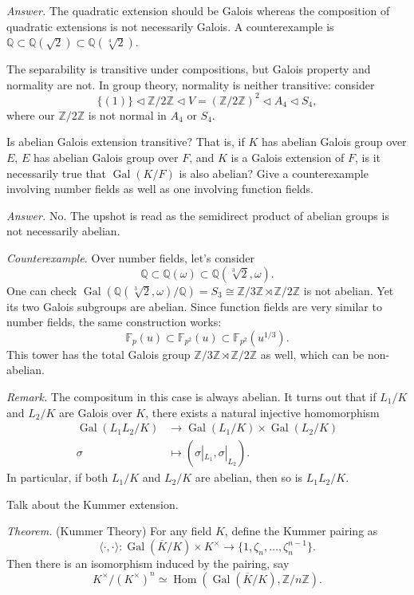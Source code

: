 \documentclass{mathproblems}
\newcommand\Q{\mathbb{Q}}
\newcommand\Z{\mathbb{Z}}
\newcommand\F{\mathbb{F}}
\DeclareMathOperator{\Hom}{Hom}
\DeclareMathOperator{\Gal}{Gal}
\begin{document}
\begin{questions}
\textit{Answer.} The quadratic extension should be Galois whereas the composition of quadratic extensions is not necessarily Galois. A counterexample is $\Q\subset \Q(\sqrt{2})\subset \Q(\sqrt[4]{2})$.

The separability is transitive under compositions, but Galois property and normality are not. In group theory, normality is neither transitive: consider
$$
\{(1)\} \triangleleft \Z/2\Z \triangleleft V=(\Z/2\Z)^2 \triangleleft A_{4} \triangleleft S_{4},
$$
where our $\Z/2\Z$ is not normal in $A_4$ or $S_4$.

\miquestion
{\color{blue} Is abelian Galois extension transitive? That is, if $K$ has abelian Galois group over $E$, $E$ has abelian Galois group over $F$, and $K$ is a Galois extension of $F$, is it necessarily true that $\Gal(K / F)$ is also abelian? Give a counterexample involving number fields as well as one involving function fields.}

\textit{Answer.} No. The upshot is read as the semidirect product of abelian groups is not necessarily abelian.

\textit{Counterexample.} Over number fields, let's consider 
$$
\Q \subset \Q(\omega) \subset \Q(\sqrt[3]{2},\omega).
$$
One can check $\Gal(\Q(\sqrt[3]{2},\omega)/\Q)=S_3\cong \Z/3\Z\rtimes \Z/2\Z$ is not abelian. Yet its two Galois subgroups are abelian. Since function fields are very similar to number fields, the same construction works:
$$
\F_p(u) \subset \F_{p^2}(u) \subset \F_{p^2}(u^{1/3}).
$$
This tower has the total Galois group $\Z/3\Z\rtimes \Z/2\Z$ as well, which can be non-abelian. 

\textit{Remark.} The compositum in this case is always abelian. It turns out that if $L_1/K$ and $L_2/K$ are Galois over $K$, there exists a natural injective homomorphism
$$
\begin{aligned}
\Gal(L_1L_2/K) & \longrightarrow \Gal(L_1/K)\times \Gal(L_2/K)\\
\sigma & \longmapsto (\sigma|_{L_1},\sigma|_{L_2}).
\end{aligned}
$$
In particular, if both $L_1/K$ and $L_2/K$ are abelian, then so is $L_1L_2/K$.

\miquestion
{\color{blue} Talk about the Kummer extension.}

{\color{violet}
\textit{Theorem.} (Kummer Theory) For any field $K$, define the Kummer pairing as
$$
\langle\cdot,\cdot\rangle: \Gal(\overline{K}/K)\times K^\times\to \{1,\zeta_n,\ldots,\zeta_n^{n-1}\}.
$$
Then there is an isomorphism induced by the pairing, say
$$
K^\times/(K^\times)^n \simeq \Hom(\Gal(\overline{K}/K),\Z/n\Z).
$$}


\end{questions}
\end{document}
